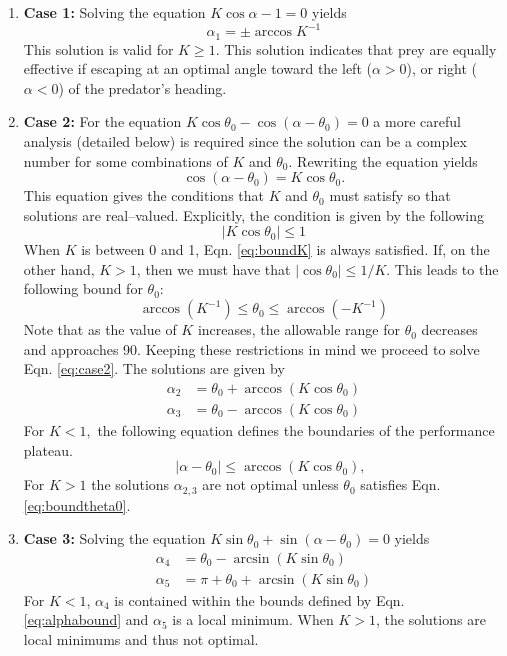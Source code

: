 \documentclass[12pt]{article}
\begin{document}
\begin{enumerate}
\item[]{\bf Case 1:} Solving the equation $K \cos \alpha - 1 = 0$ yields
\begin{equation*}
\alpha_1 = \pm \arccos K^{-1}
\end{equation*}
This solution is valid for $K\geq1.$ This solution indicates that prey are equally effective if escaping at an optimal angle toward the left ($\alpha>0$), or right ($\alpha<0$) of the predator's heading. 

\item[]{\bf Case 2:} For the equation $K\cos \theta_0 - \cos(\alpha - \theta_0) = 0$ a more careful analysis (detailed below) is required since the solution can be a complex number for some combinations of $K$ and $\theta_0.$ Rewriting the equation yields 
%
\begin{equation}
\cos(\alpha - \theta_0) = K\cos \theta_0.
\label{eq:case2}
\end{equation}
%
This equation gives the conditions that $K$ and $\theta_0$ must satisfy so that solutions are real--valued. Explicitly, the condition is given by the following
%
\begin{equation}
 | K\cos \theta_0 | \leq 1
 \label{eq:boundK}
\end{equation}
%
When $K$ is between 0 and 1, Eqn. \ref{eq:boundK} is always satisfied. If, on the other hand, $K > 1$, then we must have that $| \cos \theta_0| \leq 1/K.$ This leads to the following bound for $\theta_0$:
%
\begin{equation}
\arccos (K^{-1}) \leq \theta_0 \leq \arccos (-K^{-1})
\label{eq:boundtheta0}
\end{equation}
%
Note that as the value of $K$ increases, the allowable range for $\theta_0$ decreases and approaches 90\textdegree. Keeping these restrictions in mind we proceed to solve Eqn. \ref{eq:case2}. The solutions are given by
\begin{align*}
\alpha_2 & = \theta_0 + \arccos(K \cos \theta_0) \\
\alpha_3 & = \theta_0 - \arccos(K \cos \theta_0)
\end{align*}
For $K<1,$ the following equation defines the boundaries of the performance plateau. 
%
\begin{equation}
\quad |\alpha - \theta_0|  \leq    \arccos(K \cos  \theta_0) ,
 \end{equation}
%
For $K>1$ the solutions $\alpha_{2,3}$ are not optimal unless $\theta_0$ satisfies Eqn. \ref{eq:boundtheta0}. 

\item[]{\bf Case 3:} Solving the equation $K\sin \theta_0 + \sin(\alpha -\theta_0) = 0$ yields
\begin{align*}
\alpha_4 & = \theta_0 - \arcsin(K \sin \theta_0) \\
\alpha_5 & = \pi + \theta_0 + \arcsin(K \sin \theta_0)
\end{align*}
For $K<1$, $\alpha_4$ is contained within the bounds defined by Eqn. \ref{eq:alphabound} and $\alpha_5$ is a local minimum. When $K>1$, the solutions are local minimums and thus not optimal.     
\end{enumerate}
\end{document}
